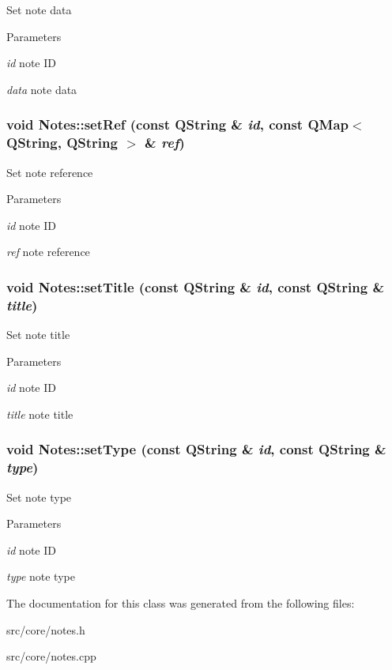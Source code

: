 \label{classNotes_a176683f801c998ff85f667947c41c7d9}
Set note data 
\begin{DoxyParams}{Parameters}
\item[{\em id}]note ID \item[{\em data}]note data \end{DoxyParams}
\hypertarget{classNotes_ad42175f40ec450badc4ed396229a3246}{
\subsubsection[{setRef}]{\setlength{\rightskip}{0pt plus 5cm}void Notes::setRef (const QString \& {\em id}, \/  const QMap$<$ QString, QString $>$ \& {\em ref})}}
\label{classNotes_ad42175f40ec450badc4ed396229a3246}
Set note reference 
\begin{DoxyParams}{Parameters}
\item[{\em id}]note ID \item[{\em ref}]note reference \end{DoxyParams}
\hypertarget{classNotes_ace9ed14dfa9f9ca785070b70a06deec3}{
\subsubsection[{setTitle}]{\setlength{\rightskip}{0pt plus 5cm}void Notes::setTitle (const QString \& {\em id}, \/  const QString \& {\em title})}}
\label{classNotes_ace9ed14dfa9f9ca785070b70a06deec3}
Set note title 
\begin{DoxyParams}{Parameters}
\item[{\em id}]note ID \item[{\em title}]note title \end{DoxyParams}
\hypertarget{classNotes_a2e471d6614087c21ad4265596387312c}{
\subsubsection[{setType}]{\setlength{\rightskip}{0pt plus 5cm}void Notes::setType (const QString \& {\em id}, \/  const QString \& {\em type})}}
\label{classNotes_a2e471d6614087c21ad4265596387312c}
Set note type 
\begin{DoxyParams}{Parameters}
\item[{\em id}]note ID \item[{\em type}]note type \end{DoxyParams}


The documentation for this class was generated from the following files:\begin{DoxyCompactItemize}
\item 
src/core/notes.h\item 
src/core/notes.cpp\end{DoxyCompactItemize}
